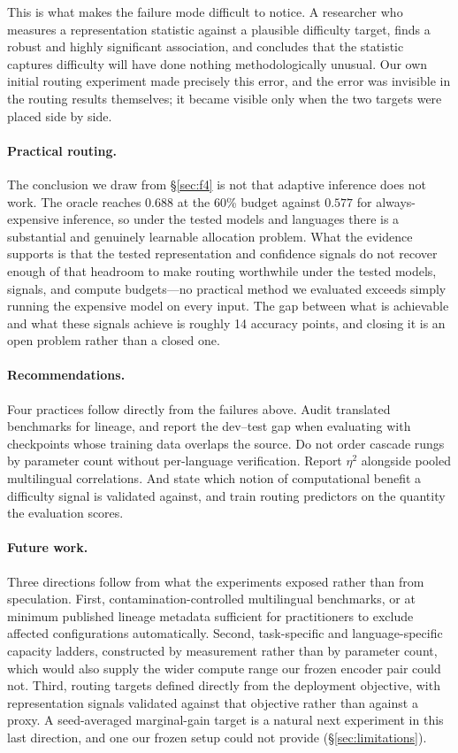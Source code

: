 \documentclass[11pt]{article}
\newcommand{\claim}[1]{#1}   %
\begin{document}
This is what makes the failure mode difficult to notice. A researcher who
measures a representation statistic against a plausible difficulty target, finds
a robust and highly significant association, and concludes that the statistic
captures difficulty will have done nothing methodologically unusual. Our own
initial routing experiment made precisely this error, and the error was invisible
in the routing results themselves; it became visible only when the two targets
were placed side by side.

\paragraph{Practical routing.} The conclusion we draw from \S\ref{sec:f4} is
not that adaptive inference does not work. The oracle reaches $0.688$ at the 60\%
budget against $0.577$ for always-expensive inference, so under the tested models
and languages there is a substantial and genuinely learnable allocation problem.
\claim{What the evidence supports is that the tested representation and
confidence signals do not recover enough of that headroom to make routing
worthwhile under the tested models, signals, and compute budgets}---no practical
method we evaluated exceeds simply running the expensive model on every input.
The gap between what is achievable and what these signals achieve is roughly 14
accuracy points, and closing it is an open problem rather than a closed one.

\paragraph{Recommendations.} Four practices follow directly from the failures
above. Audit translated benchmarks for lineage, and report the dev--test gap when
evaluating with checkpoints whose training data overlaps the source. Do not order
cascade rungs by parameter count without per-language verification. Report
$\eta^2$ alongside pooled multilingual correlations. And
\claim{state which notion of computational benefit a difficulty signal is
validated against, and train routing predictors on the quantity the evaluation
scores.}

\paragraph{Future work.} Three directions follow from what the experiments
exposed rather than from speculation. First, contamination-controlled
multilingual benchmarks, or at minimum published lineage metadata sufficient for
practitioners to exclude affected configurations automatically. Second,
task-specific and language-specific capacity ladders, constructed by measurement
rather than by parameter count, which would also supply the wider compute range
our frozen encoder pair could not. Third, routing targets defined directly from
the deployment objective, with representation signals validated against that
objective rather than against a proxy. A seed-averaged marginal-gain target is a
natural next experiment in this last direction, and one our frozen setup could
not provide (\S\ref{sec:limitations}).
\end{document}
